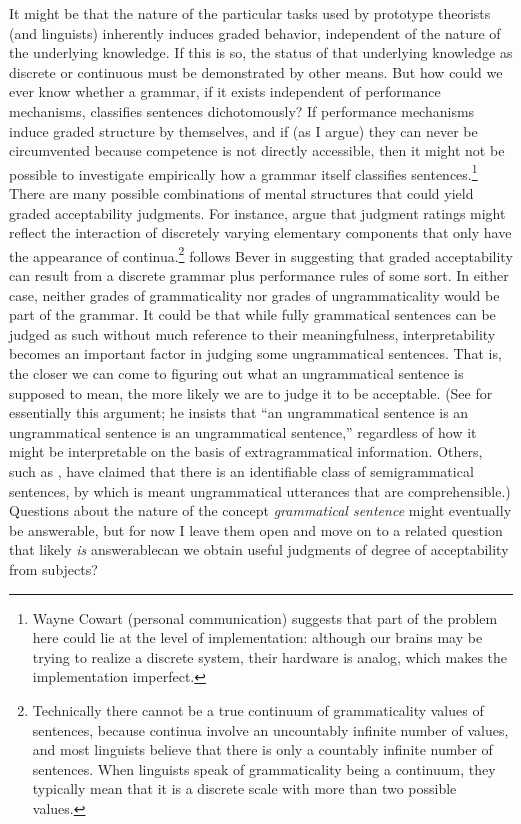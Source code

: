 It might be that the nature of the particular tasks used by prototype theorists (and linguists) inherently induces graded behavior, independent of the nature of the underlying knowledge. If this is so, the status of that underlying knowledge as discrete or continuous must be demonstrated by other means. But how could we ever know whether a grammar, if it exists independent of performance mechanisms, classifies sentences dichotomously? If performance mechanisms induce graded structure by themselves, and if (as I argue) they can never be circumvented because competence is not directly accessible, then it might not be possible to investigate empirically how a grammar itself classifies sentences.\footnote{Wayne Cowart (personal communication) suggests that part of the problem here could lie at the level of implementation: although our brains may be trying to realize a discrete system, their hardware is analog, which makes the implementation imperfect.
}
 There are many possible combinations of mental structures that could yield graded acceptability judgments. For instance,  \citet{FillmoreEtAl1979b} 
 argue that judgment ratings might reflect the interaction of discretely varying elementary components that only have the appearance of continua.\footnote{Technically there cannot be a true continuum of grammaticality values of sentences, because continua involve an uncountably infinite number of values, and most linguists believe that there is only a countably infinite number of sentences. When linguists speak of grammaticality being a continuum, they typically mean that it is a discrete scale with more than two possible values.}
 \citet{Carroll1979} follows Bever in suggesting that graded acceptability can result from a discrete 
grammar plus performance rules of some sort. In either case, neither grades of grammaticality nor grades of ungrammaticality would be part of the grammar. It could be that while fully grammatical sentences can be judged as such without much reference to their meaningfulness, interpretability becomes an important factor in judging some ungrammatical sentences. That is, the closer we can come to figuring out what an ungrammatical sentence is supposed to mean, the more likely we are to judge it to be acceptable. (See \citet{Fowler1970} for essentially this argument; he insists that ``an ungrammatical sentence is an ungrammatical sentence is an ungrammatical sentence,'' regardless of how it might be interpretable on the basis of extragrammatical information. Others, such as \citet{Katz1964}, have claimed that there is an identifiable class of semigrammatical sentences, by which is meant ungrammatical utterances that are comprehensible.) Questions about the nature of the concept \textit{grammatical sentence} might eventually be answerable, but for now I leave them open and move on to a related question that likely \textit{is} answerable\schdash{}can we obtain useful judgments of degree of acceptability from subjects?

